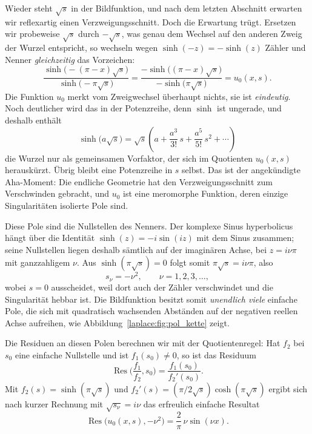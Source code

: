 Wieder steht $\sqrt{s}$ in der Bildfunktion, und nach dem letzten Abschnitt
erwarten wir reflexartig einen Verzweigungsschnitt.
Doch die Erwartung trügt.
Ersetzen wir probeweise $\sqrt{s}$ durch $-\sqrt{s}$, was genau dem
Wechsel auf den anderen Zweig der Wurzel entspricht, so wechseln wegen
$\sinh(-z) = -\sinh(z)$ Zähler und Nenner \emph{gleichzeitig} das
Vorzeichen:
\begin{equation}
    \frac{\sinh\bigl(-(\pi-x)\sqrt{s}\bigr)}
         {\sinh\bigl(-\pi\sqrt{s}\bigr)}
    =
    \frac{-\sinh\bigl((\pi-x)\sqrt{s}\bigr)}
         {-\sinh\bigl(\pi\sqrt{s}\bigr)}
    =
    u_0(x,s).
    \label{laplace:eq:eindeutigkeit}
\end{equation}
Die Funktion $u_0$ merkt vom Zweigwechsel überhaupt nichts, sie ist
\emph{eindeutig}.
Noch deutlicher wird das in der Potenzreihe, denn $\sinh$ ist ungerade, und
deshalb enthält
\begin{equation}
    \sinh\bigl(a\sqrt{s}\bigr)
    =
    \sqrt{s}
    \left(
        a + \frac{a^3}{3!}\,s + \frac{a^5}{5!}\,s^2 + \cdots
    \right)
    \label{laplace:eq:sinh_reihe}
\end{equation}
die Wurzel nur als gemeinsamen Vorfaktor, der sich im Quotienten
$u_0(x,s)$ herauskürzt.
Übrig bleibt eine Potenzreihe in $s$ selbst.
Das ist der angekündigte Aha-Moment:
Die endliche Geometrie hat den Verzweigungsschnitt zum Verschwinden
gebracht, und $u_0$ ist eine meromorphe Funktion, deren einzige
Singularitäten isolierte Pole sind.

Diese Pole sind die Nullstellen des Nenners.
Der komplexe Sinus hyperbolicus hängt über die Identität
$\sinh(z) = -i \sin(iz)$ mit dem Sinus zusammen; seine Nullstellen liegen
deshalb sämtlich auf der imaginären Achse, bei $z = i\nu\pi$ mit
ganzzahligem $\nu$.
Aus $\sinh(\pi\sqrt{s}) = 0$ folgt somit $\pi\sqrt{s} = i\nu\pi$, also
\begin{equation}
    s_\nu
    =
    -\nu^2,
    \qquad
    \nu = 1, 2, 3, \dots,
    \label{laplace:eq:polstellen}
\end{equation}
wobei $s = 0$ ausscheidet, weil dort auch der Zähler verschwindet und die
Singularität hebbar ist.
Die Bildfunktion besitzt somit \emph{unendlich viele} einfache Pole, die
sich mit quadratisch wachsenden Abständen auf der negativen reellen Achse
aufreihen, wie Abbildung~\ref{laplace:fig:pol_kette} zeigt.



Die Residuen an diesen Polen berechnen wir mit der Quotientenregel:
Hat $f_2$ bei $s_0$ eine einfache Nullstelle und ist $f_1(s_0) \neq 0$, so
ist das Residuum
\[
\operatorname{Res}\biggl(\frac{f_1}{f_2}, s_0\biggr)
=
\frac{f_1(s_0)}{f_2'(s_0)}.
\]
Mit $f_2(s) = \sinh(\pi\sqrt{s})$ und
$f_2'(s) = (\pi/2\!\sqrt{s})\cosh(\pi\sqrt{s})$ ergibt sich nach
kurzer Rechnung mit $\sqrt{s_\nu} = i\nu$ das erfreulich einfache Resultat
\begin{equation}
    \operatorname{Res}\bigl(u_0(x,s), -\nu^2\bigr)
    =
    \frac{2}{\pi} \, \nu \sin(\nu x).
    \label{laplace:eq:stab_residuen}
\end{equation}

